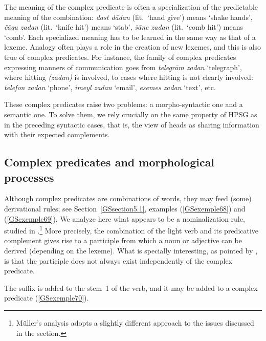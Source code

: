 \noindent
The meaning of the complex predicate is often a specialization of the predictable meaning of the combination: \emph{dast d\=adan} (lit.\ `hand give') means `shake hands', \emph{\v c\=aqu zadan} (lit.\ `knife hit') means `stab', \emph{\v s\=ane zadan} (lit.\ `comb hit') means `comb'. Each specialized meaning has to be learned in the same way as that of a lexeme. Analogy often plays a role in the creation of new lexemes, and this is also true of complex predicates. For instance, the family of complex predicates expressing manners of communication goes from \emph{telegr\=am zadan} `telegraph', where hitting \emph{(zadan)} is involved, to cases where hitting is not clearly involved: \emph{telefon zadan} `phone’, \emph{imeyl zadan} `email', \emph{esemes zadan} `text', etc.   

These complex predicates raise two problems: a morpho-syntactic one and a semantic one. To solve them, we rely crucially on the same property of HPSG as in the preceding syntactic cases, that is, the view of heads as sharing information with their expected complements. 

\subsection{Complex predicates and morphological processes}\label{GSsection5.2}

Although  complex predicates are combinations of words, they may feed (some)
derivational rules; see Section~\ref{GSsection5.1}, examples (\ref{GSexemple68}) and
(\ref{GSexemple69}). We analyze here what appears to be a nominalization rule, studied in
.\footnote{Müller’s analysis adopts a slightly different approach to the
  issues discussed in the section.} More precisely, the combination of the light verb and its
predicative complement gives rise to a participle from which a noun or adjective can be derived (depending on the
lexeme). What is specially interesting, as pointed by \citet{MuellerPersian}, is that the participle
does not always exist independently of the complex predicate.

The suffix  is added to the stem~1 of the verb, and it may be added to a complex predicate (\ref{GSexemple70}).

\eal 
	\label{GSexemple70} 
    \label{GSexemple70a}
		
